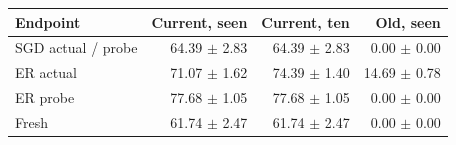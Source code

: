 \begin{tabular}{lrrr}
\toprule
Endpoint & Current, seen & Current, ten & Old, seen \\
\midrule
SGD actual / probe & 64.39 $\pm$ 2.83 & 64.39 $\pm$ 2.83 & 0.00 $\pm$ 0.00 \\
ER actual & 71.07 $\pm$ 1.62 & 74.39 $\pm$ 1.40 & 14.69 $\pm$ 0.78 \\
ER probe & 77.68 $\pm$ 1.05 & 77.68 $\pm$ 1.05 & 0.00 $\pm$ 0.00 \\
Fresh & 61.74 $\pm$ 2.47 & 61.74 $\pm$ 2.47 & 0.00 $\pm$ 0.00 \\
\bottomrule
\end{tabular}
